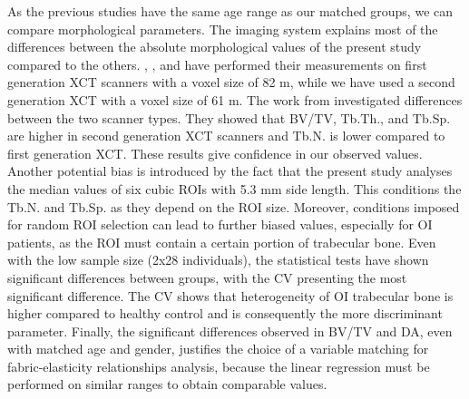 \documentclass[a4paper,fleqn]{DC_ArtStyle}
\begin{document}
As the previous studies \cite{Folkestad2012,Kocijan2015,Rolvien2018} have the same age range as our matched groups, we can compare morphological parameters. The imaging system explains most of the differences between the absolute morphological values of the present study compared to the others. \citeauthor{Folkestad2012}\cite{Folkestad2012}, \citeauthor{Kocijan2015}\cite{Kocijan2015}, and \citeauthor{Rolvien2018}\cite{Rolvien2018} have performed their measurements on first generation XCT scanners with a voxel size of 82 \si{\micro}m, while we have used a second generation XCT with a voxel size of 61 \si{\micro}m. The work from \citeauthor{Agarwal2016}\cite{Agarwal2016} investigated differences between the two scanner types. They showed that BV/TV, Tb.Th., and Tb.Sp. are higher in second generation XCT scanners and Tb.N. is lower compared to first generation XCT. These results give confidence in our observed values. Another potential bias is introduced by the fact that the present study analyses the median values of six cubic ROIs with 5.3 mm side length. This conditions the Tb.N. and Tb.Sp. as they depend on the ROI size. Moreover, conditions imposed for random ROI selection can lead to further biased values, especially for OI patients, as the ROI must contain a certain portion of trabecular bone. Even with the low sample size (2x28 individuals), the statistical tests have shown significant differences between groups, with the CV presenting the most significant difference. The CV shows that heterogeneity of OI trabecular bone is higher compared to healthy control and is consequently the more discriminant parameter. Finally, the significant differences observed in BV/TV and DA, even with matched age and gender, justifies the choice of a variable matching for fabric-elasticity relationships analysis, because the linear regression must be performed on similar ranges to obtain comparable values.\\
\end{document}

